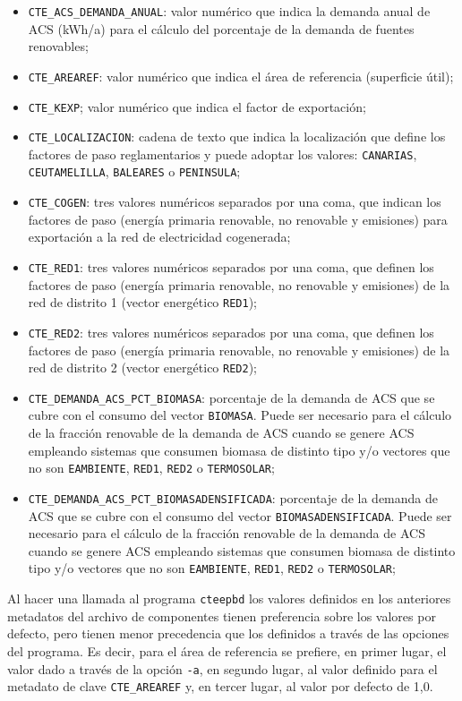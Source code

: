 \documentclass[10pt,notitlepage,oneside,a4paper]{article}
\begin{document}
\begin{itemize}
\item \texttt{CTE\_ACS\_DEMANDA\_ANUAL}: valor numérico que indica la demanda anual de ACS (kWh/a) para el cálculo del porcentaje de la demanda de fuentes renovables;
\item \texttt{CTE\_AREAREF}: valor numérico que indica el área de referencia (superficie útil);
\item \texttt{CTE\_KEXP}; valor numérico que indica el factor de exportación;
\item \texttt{CTE\_LOCALIZACION}: cadena de texto que indica la localización que define los factores de paso reglamentarios y puede adoptar los valores: \texttt{CANARIAS}, \texttt{CEUTAMELILLA}, \texttt{BALEARES} o \texttt{PENINSULA};
\item \texttt{CTE\_COGEN}: tres valores numéricos separados por una coma, que indican los factores de paso (energía primaria renovable, no renovable y emisiones) para exportación a la red de electricidad cogenerada;
\item \texttt{CTE\_RED1}: tres valores numéricos separados por una coma, que definen los factores de paso (energía primaria renovable, no renovable y emisiones) de la red de distrito 1 (vector energético \texttt{RED1});
\item \texttt{CTE\_RED2}: tres valores numéricos separados por una coma, que definen los factores de paso (energía primaria renovable, no renovable y emisiones) de la red de distrito 2 (vector energético \texttt{RED2});
\item \texttt{CTE\_DEMANDA\_ACS\_PCT\_BIOMASA}: porcentaje de la demanda de ACS que se cubre con el consumo del vector \texttt{BIOMASA}. Puede ser necesario para el cálculo de la fracción renovable de la demanda de ACS cuando se genere ACS empleando sistemas que consumen biomasa de distinto tipo y/o vectores que no son \texttt{EAMBIENTE}, \texttt{RED1}, \texttt{RED2} o \texttt{TERMOSOLAR};
\item \texttt{CTE\_DEMANDA\_ACS\_PCT\_BIOMASADENSIFICADA}: porcentaje de la demanda de ACS que se cubre con el consumo del vector \texttt{BIOMASADENSIFICADA}. Puede ser necesario para el cálculo de la fracción renovable de la demanda de ACS cuando se genere ACS empleando sistemas que consumen biomasa de distinto tipo y/o vectores que no son \texttt{EAMBIENTE}, \texttt{RED1}, \texttt{RED2} o \texttt{TERMOSOLAR};
\end{itemize}

Al hacer una llamada al programa \texttt{cteepbd} los valores definidos en los anteriores metadatos del archivo de componentes tienen preferencia sobre los valores por defecto, pero tienen menor precedencia que los definidos a través de las opciones del programa. Es decir, para el área de referencia se prefiere, en primer lugar, el valor dado a través de la opción \texttt{-a}, en segundo lugar, al valor definido para el metadato de clave \texttt{CTE\_AREAREF} y, en tercer lugar, al valor por defecto de 1,0.
\end{document}
